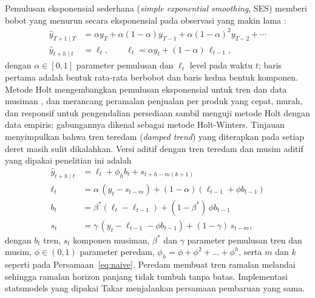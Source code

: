 Pemulusan eksponensial sederhana (\textit{simple exponential smoothing}, SES) memberi bobot yang menurun secara eksponensial pada observasi yang makin lama \citep*{hyndman2021forecasting}:
\begin{equation}
\begin{aligned}
\hat{y}_{T+1\mid T} &= \alpha y_T + \alpha(1-\alpha) y_{T-1} + \alpha(1-\alpha)^2 y_{T-2} + \cdots \\
\hat{y}_{t+h\mid t} &= \ell_t, \qquad \ell_t = \alpha y_t + (1-\alpha)\,\ell_{t-1},
\end{aligned}
\label{eq:ses}
\end{equation}
dengan $\alpha \in [0, 1]$ parameter pemulusan dan $\ell_t$ level pada waktu $t$; baris pertama adalah bentuk rata-rata berbobot dan baris kedua bentuk komponen. Metode Holt mengembangkan pemulusan eksponensial untuk tren dan data musiman \citep*{holt2004forecasting}, dan \citet*{winters1960forecasting} merancang peramalan penjualan per produk yang cepat, murah, dan responsif untuk pengendalian persediaan sambil menguji metode Holt dengan data empiris; gabungannya dikenal sebagai metode Holt-Winters. Tinjauan \citet*{gardner2006exponential} menyimpulkan bahwa tren teredam (\textit{damped trend}) yang diterapkan pada setiap deret masih sulit dikalahkan. Versi aditif dengan tren teredam dan musim aditif yang dipakai penelitian ini adalah \citep*{hyndman2021forecasting}
\begin{equation}
\begin{aligned}
\hat{y}_{t+h\mid t} &= \ell_t + \phi_h b_t + s_{t+h-m(k+1)} \\
\ell_t &= \alpha\,(y_t - s_{t-m}) + (1-\alpha)(\ell_{t-1} + \phi b_{t-1}) \\
b_t &= \beta^{*}(\ell_t - \ell_{t-1}) + (1-\beta^{*})\,\phi b_{t-1} \\
s_t &= \gamma\,(y_t - \ell_{t-1} - \phi b_{t-1}) + (1-\gamma)\,s_{t-m},
\end{aligned}
\label{eq:holt-winters}
\end{equation}
dengan $b_t$ tren, $s_t$ komponen musiman, $\beta^{*}$ dan $\gamma$ parameter pemulusan tren dan musim, $\phi \in (0, 1)$ parameter peredam, $\phi_h = \phi + \phi^2 + \dots + \phi^h$, serta $m$ dan $k$ seperti pada Persamaan~\eqref{eq:naive}. Peredam membuat tren ramalan melandai sehingga ramalan horizon panjang tidak tumbuh tanpa batas. Implementasi statsmodels \citep*{seabold2010statsmodels} yang dipakai Takar menjalankan persamaan pembaruan yang sama.


